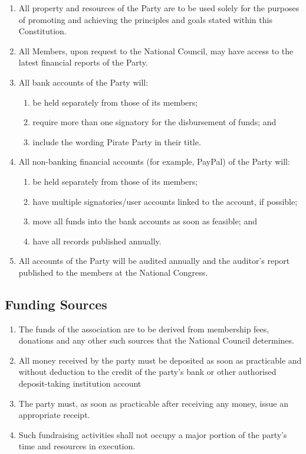 \documentclass[a4paper,titlepage,8.5pt]{article}
\begin{document}
\begin{enumerate}
\item All property and resources of the Party are to be used solely for the purposes of promoting and achieving the principles and goals stated within this Constitution.
\item All Members, upon request to the National Council, may have access to the latest financial reports of the Party.
\item All bank accounts of the Party will:
\begin{enumerate}
\item be held separately from those of its members;
\item require more than one signatory for the disbursement of funds; and
\item include the wording Pirate Party in their title.
\end{enumerate}
\item All non-banking financial accounts (for example, PayPal) of the Party will:
\begin{enumerate}
\item be held separately from those of its members;
\item have multiple signatories/user accounts linked to the account, if possible;
\item move all funds into the bank accounts as soon as feasible; and
\item have all records published annually.
\end{enumerate}
\item All accounts of the Party will be audited annually and the auditor’s report published to the members at the National Congress.
\end{enumerate}

\subsection{Funding Sources}

\begin{enumerate}
\item The funds of the association are to be derived from membership fees, donations and any other such sources that the National Council determines.
\item All money received by the party must be deposited as soon as practicable and without deduction to the credit of the party's bank or other authorised deposit-taking institution account
\item The party must, as soon as practicable after receiving any money, issue an appropriate receipt.
\item Such fundraising activities shall not occupy a major portion of the party's time and resources in execution.
\end{enumerate}
\end{document}

